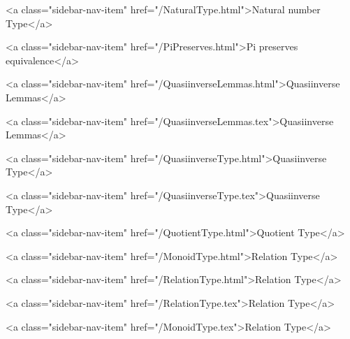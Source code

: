       
    
      
        
          <a class="sidebar-nav-item" href="/NaturalType.html">Natural number Type</a>
        
      
    
      
        
          <a class="sidebar-nav-item" href="/PiPreserves.html">Pi preserves equivalence</a>
        
      
    
      
        
          <a class="sidebar-nav-item" href="/QuasiinverseLemmas.html">Quasiinverse Lemmas</a>
        
      
    
      
        
          <a class="sidebar-nav-item" href="/QuasiinverseLemmas.tex">Quasiinverse Lemmas</a>
        
      
    
      
        
          <a class="sidebar-nav-item" href="/QuasiinverseType.html">Quasiinverse Type</a>
        
      
    
      
        
          <a class="sidebar-nav-item" href="/QuasiinverseType.tex">Quasiinverse Type</a>
        
      
    
      
        
          <a class="sidebar-nav-item" href="/QuotientType.html">Quotient Type</a>
        
      
    
      
        
          <a class="sidebar-nav-item" href="/MonoidType.html">Relation Type</a>
        
      
    
      
        
          <a class="sidebar-nav-item" href="/RelationType.html">Relation Type</a>
        
      
    
      
        
          <a class="sidebar-nav-item" href="/RelationType.tex">Relation Type</a>
        
      
    
      
        
          <a class="sidebar-nav-item" href="/MonoidType.tex">Relation Type</a>
        
